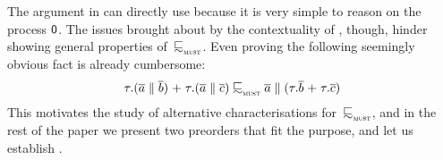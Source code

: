 \begin{example}

\end{example}

The argument in  can directly use 
because it is very simple to reason on the process $\mathop{\textsf{0}}$.
The issues brought about by the contextuality of ,
though, hinder showing general properties of~$\testleqS$.
Even proving the following seemingly obvious fact is already cumbersome:
  \begin{equation}
    \label{eq:mailbox-hoisting}
     \tau.(\co{\aa} \Par \co{b}) \extc
     \tau.(\co{\aa} \Par \co{c}) \testleqS \co{\aa} \Par (\tau.\co{b} \extc
     \tau.\co{c})
  \end{equation}
This motivates the study of alternative characterisations for~$\testleqS$,
and in the rest of the paper we present two preorders that fit the purpose,
and let us establish .


